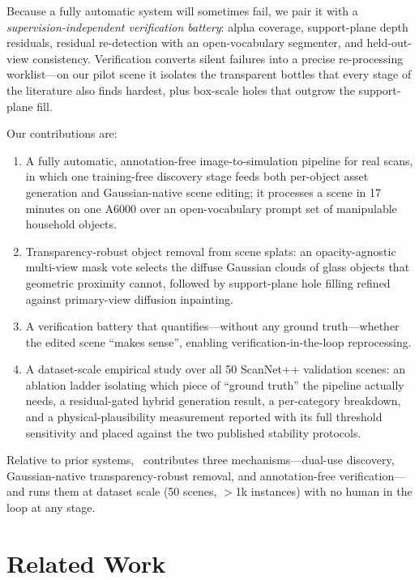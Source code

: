 Because a fully automatic system will sometimes fail, we pair it with a
\emph{supervision-independent verification battery}: alpha coverage,
support-plane depth residuals, residual re-detection with an
open-vocabulary segmenter, and held-out-view consistency. Verification
converts silent failures into a precise re-processing worklist---on our
pilot scene it isolates the transparent bottles that every stage of the
literature also finds hardest, plus box-scale holes that outgrow the
support-plane fill.

Our contributions are:
\begin{enumerate}
\item A fully automatic, annotation-free image-to-simulation pipeline for
  real scans, in which one training-free discovery stage feeds both
  per-object asset generation and Gaussian-native scene editing; it
  processes a scene in 17 minutes on one A6000 over an open-vocabulary
  prompt set of manipulable household objects.
\item Transparency-robust object removal from scene splats: an
  opacity-agnostic multi-view mask vote selects the diffuse Gaussian
  clouds of glass objects that geometric proximity cannot, followed by
  support-plane hole filling refined against primary-view diffusion
  inpainting.
\item A verification battery that quantifies---without any ground
  truth---whether the edited scene ``makes sense'', enabling
  verification-in-the-loop reprocessing.
\item A dataset-scale empirical study over all 50 ScanNet++ validation
  scenes: an ablation ladder isolating which piece of ``ground truth'' the
  pipeline actually needs, a residual-gated hybrid generation result, a
  per-category breakdown, and a physical-plausibility measurement reported
  with its full threshold sensitivity and placed against the two published
  stability protocols.
\end{enumerate}

Relative to prior systems, \name\ contributes three mechanisms---dual-use
discovery, Gaussian-native transparency-robust removal, and
annotation-free verification---and runs them at dataset scale (50 scenes,
$>$1k instances) with no human in the loop at any stage.

\section{Related Work}

